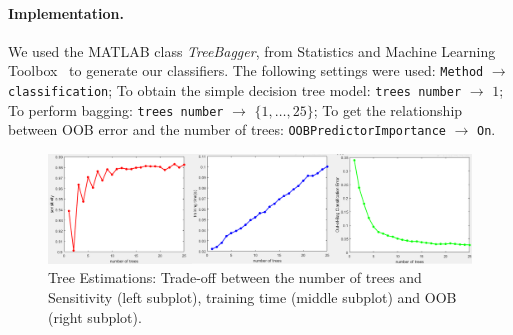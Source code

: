 \paragraph{Implementation.}
We used the MATLAB class \textit{TreeBagger}, from Statistics and 
Machine Learning Toolbox~\cite{treebagger_matlab} to generate our 
classifiers. The following settings were used: 
\texttt{Method} $\to$ \texttt{classification}; To obtain the simple 
decision tree model: \texttt{trees 
number} $\to$ $1$; 
To perform bagging: \texttt{trees number} $\to$ $\{1,\ldots,25\}$; 
To get the relationship between OOB error and the number of trees:
\texttt{OOBPredictorImportance} $\to$ \texttt{On}. 


\begin{figure}[t]
	\centering
	\includegraphics[width=1\textwidth]{figures/tree_graph.png}
	\caption{Tree Estimations: Trade-off between the number of trees 
	and Sensitivity (left subplot), training time (middle subplot) 
	and OOB (right subplot).}
	\label{fig:tree_graph}
\end{figure}